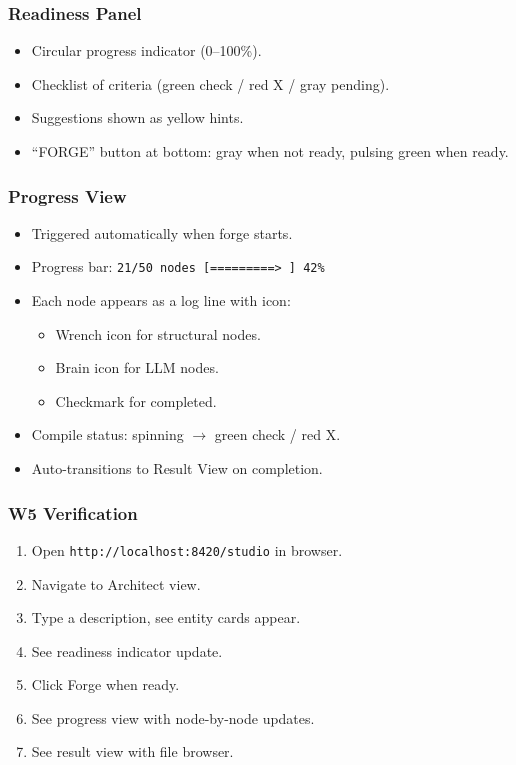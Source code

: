 \documentclass[11pt,a4paper]{article}
\begin{document}
\subsubsection{Readiness Panel}

\begin{itemize}[nosep]
\item Circular progress indicator (0--100\%).
\item Checklist of criteria (green check / red X / gray pending).
\item Suggestions shown as yellow hints.
\item ``FORGE'' button at bottom: gray when not ready, 
      pulsing green when ready.
\end{itemize}

\subsubsection{Progress View}

\begin{itemize}[nosep]
\item Triggered automatically when forge starts.
\item Progress bar: \texttt{21/50 nodes [=========>          ] 42\%}
\item Each node appears as a log line with icon:
      \begin{itemize}[nosep]
      \item Wrench icon for structural nodes.
      \item Brain icon for LLM nodes.
      \item Checkmark for completed.
      \end{itemize}
\item Compile status: spinning $\to$ green check / red X.
\item Auto-transitions to Result View on completion.
\end{itemize}

\subsubsection{W5 Verification}

\begin{enumerate}[nosep]
\item Open \texttt{http://localhost:8420/studio} in browser.
\item Navigate to Architect view.
\item Type a description, see entity cards appear.
\item See readiness indicator update.
\item Click Forge when ready.
\item See progress view with node-by-node updates.
\item See result view with file browser.
\end{enumerate}
\end{document}
